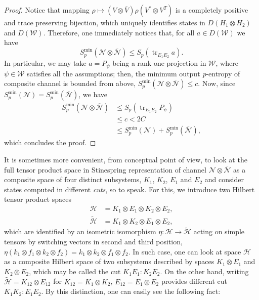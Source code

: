 \documentclass[reqno]{amsart}
\theoremstyle{plain}
\theoremstyle{note}
\newcommand{\ptr}[2]{\operatorname{tr}_{#1}{#2}}
\newcommand{\proj}[1]{P_{#1}}
\begin{document}
 \begin{proof}
Notice that mapping $\rho \mapsto (V\otimes \overline{V})\rho (V^* \otimes V^T)$ is a completely positive and trace preserving bijection, which uniquely identifies states in $D(H_1\otimes H_2)$ and $D(\mathcal{W})$. Therefore, one immediately notices that, for all $a \in D(\mathcal{W})$ we have
 \begin{equation}
     S_{p}^{\mathrm{min}}(\mathcal{N}\otimes\overline{\mathcal{N}}) \leqslant S_{p}(\ptr{E_1 E_2}{a}).
 \end{equation}
 In particular, we may take $a = \proj{\psi}$ being a rank one projection in $\mathcal{W}$, where $\psi\in\mathcal{W}$ satisfies all the assumptions; then, the minimum output \textit{p}-entropy of composite channel is bounded from above, $S_{p}^{\mathrm{min}}(\mathcal{N}\otimes\overline{\mathcal{N}}) \leqslant c$. Now, since $S_{p}^{\mathrm{min}}(\mathcal{N}) = S_{p}^{\mathrm{min}}(\overline{\mathcal{N}})$, we have
 \begin{align}
     S_{p}^{\mathrm{min}}(\mathcal{N}\otimes\overline{\mathcal{N}}) &\leqslant S_{p}(\ptr{E_1 E_2}{\proj{\psi}}) \\
     &\leqslant c < 2C \nonumber \\
     &\leqslant S_{p}^{\mathrm{min}}(\mathcal{N}) + S_{p}^{\mathrm{min}}(\overline{\mathcal{N}}),\nonumber
 \end{align}
which concludes the proof.
 \end{proof}

It is sometimes more convenient, from conceptual point of view, to look at the full tensor product space in Stinespring representation of channel $\mathcal{N}\otimes\overline{\mathcal{N}}$ as a composite space of four distinct subsystems, $K_1$, $K_2$, $E_1$ and $E_2$ and consider states computed in different \emph{cuts}, so to speak. For this, we introduce two Hilbert tensor product spaces
\begin{align}
    \mathcal{H} &= K_1 \otimes E_1 \otimes K_2 \otimes E_2, \\
    \tilde{\mathcal{H}} &= K_1 \otimes K_2 \otimes E_1 \otimes E_2 ,\nonumber
\end{align}
which are identified by an isometric isomorphism $\eta : \mathcal{H} \to \tilde{\mathcal{H}}$ acting on simple tensors by switching vectors in second and third position, $\eta (k_1 \otimes f_1 \otimes k_2 \otimes f_2) = k_1 \otimes k_2 \otimes f_1 \otimes f_2$. In such case, one can look at space $\mathcal{H}$ as a composite Hilbert space of two subsystems described by spaces $K_1 \otimes E_1$ and $K_2 \otimes E_2$, which may be called the cut $K_1 E_1 : K_2 E_2$. On the other hand, writing $\tilde{\mathcal{H}} = K_{12} \otimes E_{12}$ for $K_{12} = K_1 \otimes K_2$, $E_{12} = E_1 \otimes E_2$ provides different cut $K_1 K_2 : E_1 E_2$. By this distinction, one can easily see the following fact:
\end{document}
